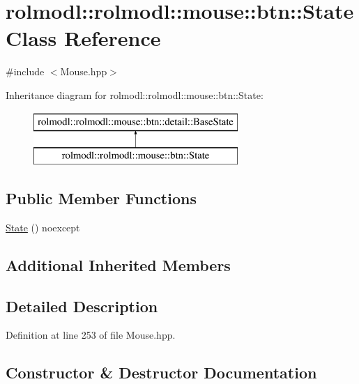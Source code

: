 \hypertarget{classrolmodl_1_1rolmodl_1_1mouse_1_1btn_1_1_state}{}\section{rolmodl\+::rolmodl\+::mouse\+::btn\+::State Class Reference}
\label{classrolmodl_1_1rolmodl_1_1mouse_1_1btn_1_1_state}


{\ttfamily \#include $<$Mouse.\+hpp$>$}

Inheritance diagram for rolmodl\+::rolmodl\+::mouse\+::btn\+::State\+:\begin{figure}[H]
\begin{center}
\leavevmode
\includegraphics[height=2.000000cm]{classrolmodl_1_1rolmodl_1_1mouse_1_1btn_1_1_state}
\end{center}
\end{figure}
\subsection*{Public Member Functions}
\begin{DoxyCompactItemize}
\item 
\mbox{\hyperlink{classrolmodl_1_1rolmodl_1_1mouse_1_1btn_1_1_state_a3d171cbd69f25a9fd32e7aa19738d072}{State}} () noexcept
\end{DoxyCompactItemize}
\subsection*{Additional Inherited Members}


\subsection{Detailed Description}


Definition at line 253 of file Mouse.\+hpp.



\subsection{Constructor \& Destructor Documentation}
\mbox{\label{classrolmodl_1_1rolmodl_1_1mouse_1_1btn_1_1_state_a3d171cbd69f25a9fd32e7aa19738d072}} 
